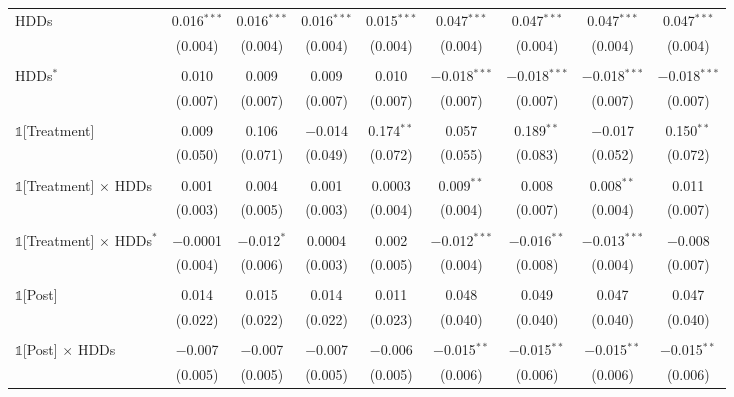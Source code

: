 \begin{ThreePartTable}
\begin{landscape}
\begin{longtable}{@{\extracolsep{1.5pt}}lcccccccc}
            HDDs & 0.016$^{***}$ & 0.016$^{***}$ & 0.016$^{***}$ & 0.015$^{***}$ & 0.047$^{***}$ & 0.047$^{***}$ & 0.047$^{***}$ & 0.047$^{***}$ \\
            & (0.004) & (0.004) & (0.004) & (0.004) & (0.004) & (0.004) & (0.004) & (0.004) \\
            & & & & & & & & \\
            HDDs$^{*}$ & 0.010 & 0.009 & 0.009 & 0.010 & $-$0.018$^{***}$ & $-$0.018$^{***}$ & $-$0.018$^{***}$ & $-$0.018$^{***}$ \\
            & (0.007) & (0.007) & (0.007) & (0.007) & (0.007) & (0.007) & (0.007) & (0.007) \\
            & & & & & & & & \\
            $\mathbb{1}$[Treatment] & 0.009 & 0.106 & $-$0.014 & 0.174$^{**}$ & 0.057 & 0.189$^{**}$ & $-$0.017 & 0.150$^{**}$ \\
            & (0.050) & (0.071) & (0.049) & (0.072) & (0.055) & (0.083) & (0.052) & (0.072) \\
            & & & & & & & & \\
            $\mathbb{1}$[Treatment] $\times$ HDDs & 0.001 & 0.004 & 0.001 & 0.0003 & 0.009$^{**}$ & 0.008 & 0.008$^{**}$ & 0.011 \\
            & (0.003) & (0.005) & (0.003) & (0.004) & (0.004) & (0.007) & (0.004) & (0.007) \\
            & & & & & & & & \\
            $\mathbb{1}$[Treatment] $\times$ HDDs$^{*}$ & $-$0.0001 & $-$0.012$^{*}$ & 0.0004 & 0.002 & $-$0.012$^{***}$ & $-$0.016$^{**}$ & $-$0.013$^{***}$ & $-$0.008 \\
            & (0.004) & (0.006) & (0.003) & (0.005) & (0.004) & (0.008) & (0.004) & (0.007) \\
            & & & & & & & & \\
            $\mathbb{1}$[Post] & 0.014 & 0.015 & 0.014 & 0.011 & 0.048 & 0.049 & 0.047 & 0.047 \\
            & (0.022) & (0.022) & (0.022) & (0.023) & (0.040) & (0.040) & (0.040) & (0.040) \\
            & & & & & & & & \\
            $\mathbb{1}$[Post] $\times$ HDDs & $-$0.007 & $-$0.007 & $-$0.007 & $-$0.006 & $-$0.015$^{**}$ & $-$0.015$^{**}$ & $-$0.015$^{**}$ & $-$0.015$^{**}$ \\
            & (0.005) & (0.005) & (0.005) & (0.005) & (0.006) & (0.006) & (0.006) & (0.006) \\

\end{longtable}
\end{landscape}
\end{ThreePartTable}
